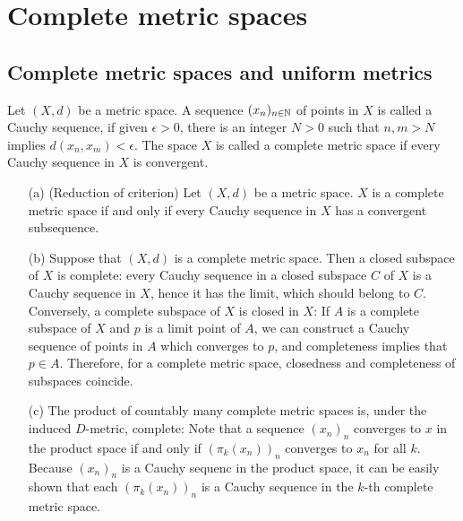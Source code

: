 \section{Complete metric spaces}

\subsection{Complete metric spaces and uniform metrics}
\begin{defi}
    Let $(X, d)$ be a metric space.
    A sequence $(x_n)_{n\in{\mathbb{N}}}$ of points in $X$ is called a Cauchy sequence, if given $\epsilon>0$, there is an integer $N>0$ such that $n, m>N$ implies $d(x_n, x_m)<\epsilon$.
    The space $X$ is called a complete metric space if every Cauchy sequence in $X$ is convergent.
\end{defi}
\begin{rmk}
    \begin{enumerate}
        \item[(a)]
        {
            (Reduction of criterion)
            Let $(X, d)$ be a metric space.
            $X$ is a complete metric space if and only if every Cauchy sequence in $X$ has a convergent subsequence.
        }
        \item[(b)]
        {
            Suppose that $(X, d)$ is a complete metric space.
            Then a closed subspace of $X$ is complete: every Cauchy sequence in a closed subspace $C$ of $X$ is a Cauchy sequence in $X$, hence it has the limit, which should belong to $C$.
            Conversely, a complete subspace of $X$ is closed in $X$: If $A$ is a complete subspace of $X$ and $p$ is a limit point of $A$, we can construct a Cauchy sequence of points in $A$ which converges to $p$, and completeness implies that $p\in A$.
            Therefore, for a complete metric space, closedness and completeness of subspaces coincide.
        }
        \item[(c)]
        {
            The product of countably many complete metric spaces is, under the induced $D$-metric, complete: Note that a sequence $(x_n)_n$ converges to $x$ in the product space if and only if $(\pi_k(x_n))_n$ converges to $x_n$ for all $k$.
            Because $(x_n)_n$ is a Cauchy sequenc in the product space, it can be easily shown that each $(\pi_k(x_n))_n$ is a Cauchy sequence in the $k$-th complete metric space.
        }
    \end{enumerate}
\end{rmk}

